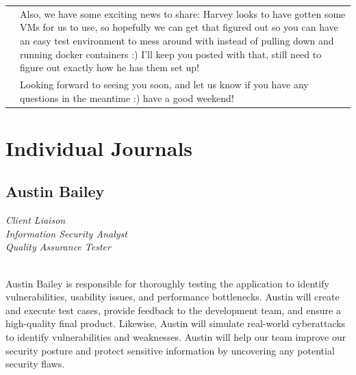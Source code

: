 \documentclass[oneside,openany,obeyspaces]{book}
\newcommand\tab[1][1cm]{\hspace*{#1}}
\begin{document}
\begin{flushleft}
\begin{center}
\begin{longtable}{ p{1.5cm} p{13.5cm} }
                                    & Also, we have some exciting news to share: Harvey looks to have gotten some VMs for us to use, so hopefully we can get that figured out so you can have an easy test environment to mess around with instead of pulling down and running docker containers :) I’ll keep you posted with that, still need to figure out exactly how he has them set up!                                                                                                                                                                                                                                                                                                                                  \\

                                    & Looking forward to seeing you soon, and let us know if you have any questions in the meantime :) have a good weekend!                                                                                                                                                                                                                                                                                                                                                                                                                                                                                                                                                                   \\ \hline
        \end{longtable}
    \end{center}


    \section{Individual Journals}

    \subsection{Austin Bailey}

    \textit{Client Liaison\\
        Information Security Analyst\\
        Quality Assurance Tester\\~\\}

    \tab Austin Bailey is responsible for thoroughly testing the application to identify vulnerabilities, usability issues, and performance bottlenecks. Austin will create and execute test cases, provide feedback to the development team, and ensure a high-quality final product. Likewise, Austin will simulate real-world cyberattacks to identify vulnerabilities and weaknesses. Austin will help our team improve our security posture and protect sensitive information by uncovering any potential security flaws.\\~\\


\end{flushleft}
\end{document}
